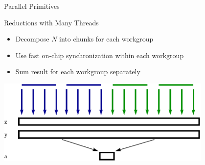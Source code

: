 \begin{frame}{Parallel Primitives}

\begin{block}{Reductions with Many Threads}
  \begin{itemize}
   \item Decompose $N$ into chunks for each workgroup
   \item Use fast on-chip synchronization within each workgroup
   \item Sum result for each workgroup separately
  \end{itemize}
\end{block}

\begin{center} \includegraphics[width=0.8\textwidth]{figures/inner-product-kernel} \end{center}


\end{frame}




% 


